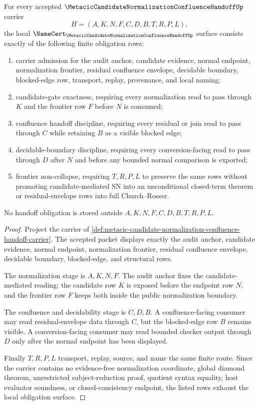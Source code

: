 \begin{theorem}
\label{thm:metacic-candidate-normalization-confluence-handoff-boundary}
For every accepted $\MetacicCandidateNormalizationConfluenceHandoffUp$ carrier
$$
H=(A,K,N,F,C,D,B,T,R,P,L),
$$
the local $\NameCert_{\MetacicCandidateNormalizationConfluenceHandoffUp}$ surface consists exactly of the following finite obligation rows:
\begin{enumerate}
\item carrier admission for the audit anchor, candidate evidence, normal endpoint, normalization frontier, residual confluence envelope, decidable boundary, blocked-edge row, transport, replay, provenance, and local naming;
\item candidate-gate exactness, requiring every normalization read to pass through $K$ and the frontier row $F$ before $N$ is consumed;
\item confluence handoff discipline, requiring every residual or join read to pass through $C$ while retaining $B$ as a visible blocked edge;
\item decidable-boundary discipline, requiring every conversion-facing read to pass through $D$ after $N$ and before any bounded normal comparison is exported;
\item frontier non-collapse, requiring $T,R,P,L$ to preserve the same rows without promoting candidate-mediated SN into an unconditional closed-term theorem or residual-envelope rows into full Church--Rosser.
\end{enumerate}
No handoff obligation is stored outside $A,K,N,F,C,D,B,T,R,P,L$.
\end{theorem}
\begin{proof}
Project the carrier of \autoref{def:metacic-candidate-normalization-confluence-handoff-carrier}. The accepted packet displays exactly the audit anchor, candidate evidence, normal endpoint, normalization frontier, residual confluence envelope, decidable boundary, blocked-edge, and structural rows.

The normalization stage is $A,K,N,F$. The audit anchor fixes the candidate-mediated reading; the candidate row $K$ is exposed before the endpoint row $N$, and the frontier row $F$ keeps both inside the public normalization boundary.

The confluence and decidability stage is $C,D,B$. A confluence-facing consumer may read residual-envelope data through $C$, but the blocked-edge row $B$ remains visible. A conversion-facing consumer may read bounded checker output through $D$ only after the normal endpoint has been displayed.

Finally $T,R,P,L$ transport, replay, source, and name the same finite route. Since the carrier contains no evidence-free normalization coordinate, global diamond theorem, unrestricted subject-reduction proof, quotient syntax equality, host evaluator soundness, or closed-consistency endpoint, the listed rows exhaust the local obligation surface.
\end{proof}

